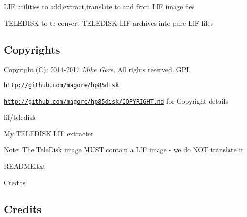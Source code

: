 
\begin{DoxyItemize}
\item L\+IF utilities to add,extract,translate to and from L\+IF image fies
\item T\+E\+L\+E\+D\+I\+SK to to convert T\+E\+L\+E\+D\+I\+SK L\+IF archives into pure L\+IF files 

 \subsection*{Copyrights}
\end{DoxyItemize}


\begin{DoxyItemize}
\item Copyright (C); 2014-\/2017 {\itshape Mike Gore}, All rights reserved. G\+PL
\begin{DoxyItemize}
\item \href{http://github.com/magore/hp85disk}{\tt http\+://github.\+com/magore/hp85disk}
\item \href{http://github.com/magore/hp85disk/COPYRIGHT.md}{\tt http\+://github.\+com/magore/hp85disk/\+C\+O\+P\+Y\+R\+I\+G\+H\+T.\+md} for Copyright details
\item lif/teledisk
\begin{DoxyItemize}
\item My T\+E\+L\+E\+D\+I\+SK L\+IF extracter
\begin{DoxyItemize}
\item Note\+: The Tele\+Disk image M\+U\+ST contain a L\+IF image -\/ we do N\+OT translate it
\end{DoxyItemize}
\item R\+E\+A\+D\+M\+E.\+txt
\begin{DoxyItemize}
\item Credits
\end{DoxyItemize}
\end{DoxyItemize}
\end{DoxyItemize}
\end{DoxyItemize}



 \subsection*{Credits}


